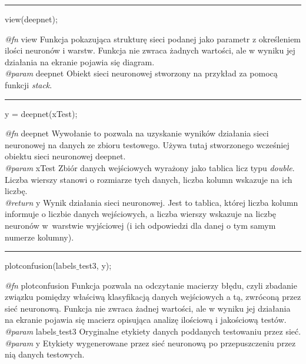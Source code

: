 \vspace{1cm}
\hrule
\vspace{1cm}

\noindent view(deepnet);
\vspace{1cm}

\noindent \textit{@fn} view Funkcja pokazująca strukturę sieci podanej jako parametr z określeniem ilości neuronów i warstw. Funkcja nie zwraca żadnych wartości, ale w wyniku jej działania na ekranie pojawia się diagram.
\\ \textit{@param} deepnet Obiekt sieci neuronowej stworzony na przykład za pomocą funkcji \textit{stack}.

\vspace{1cm}
\hrule
\vspace{1cm}

\noindent y = deepnet(xTest);
\vspace{1cm}

\noindent \textit{@fn} deepnet Wywołanie to pozwala na uzyskanie wyników działania sieci neuronowej na danych ze zbioru testowego. Używa tutaj stworzonego wcześniej obiektu sieci neuronowej deepnet.
\\ \textit{@param} xTest Zbiór danych wejściowych wyrażony jako tablica licz typu \textit{double}. Liczba wierszy stanowi o rozmiarze tych danych, liczba kolumn wskazuje na ich liczbę.
\\ \textit{@return} y Wynik działania sieci neuronowej. Jest to tablica, której liczba kolumn informuje o liczbie danych wejściowych, a liczba wierszy wskazuje na liczbę neuronów w~warstwie wyjściowej (i ich odpowiedzi dla danej o tym samym numerze kolumny).

\vspace{1cm}
\hrule
\vspace{1cm}

\noindent plotconfusion(labels$\_$test3, y);
\vspace{1cm}

\noindent \textit{@fn} plotconfusion Funkcja pozwala na odczytanie macierzy błędu, czyli zbadanie związku pomiędzy właściwą klasyfikacją danych wejściowych a tą, zwróconą przez sieć neuronową. Funkcja nie zwraca żadnej wartości, ale w wyniku jej działania na ekranie pojawia się macierz opisująca analizę ilościową i jakościową testów.
\\ \textit{@param} labels$\_$test3 Oryginalne etykiety danych poddanych testowaniu przez sieć.
\\ \textit{@param} y Etykiety wygenerowane przez sieć neuronową po przepuszczeniu przez nią danych testowych.

